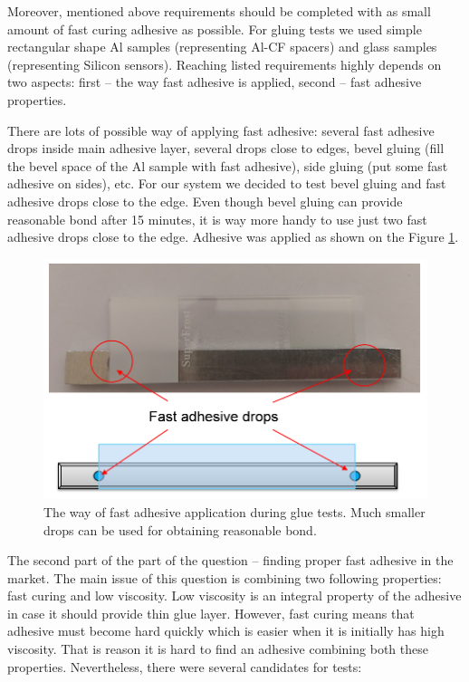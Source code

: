 Moreover, mentioned above requirements should be completed with as small amount of fast curing adhesive as possible. For gluing tests we used simple rectangular shape Al samples (representing Al-CF spacers) and glass samples (representing Silicon sensors). Reaching listed requirements highly depends on two aspects: first -- the way fast adhesive is applied, second -- fast adhesive properties.

There are lots of possible way of applying fast adhesive: several fast adhesive drops inside main adhesive layer, several drops close to edges, bevel gluing (fill the bevel space of the Al sample with fast adhesive), side gluing (put some fast adhesive on sides), etc. For our system we decided to test bevel gluing and fast adhesive drops close to the edge. Even though bevel gluing can provide reasonable bond after 15 minutes, it is way more handy to use just two fast adhesive drops close to the edge. Adhesive was applied as shown on the Figure \ref{fig:glue_application}. 

\begin{figure}[ht]\centering
\includegraphics[width=0.7\linewidth]{Data/Module_assembly/Fast_glue_application.png}
\caption{The way of fast adhesive application during glue tests. Much smaller drops can be used for obtaining reasonable bond.}
\label{fig:glue_application}
\end{figure}

The second part of the part of the question -- finding proper fast adhesive in the market. The main issue of this question is combining two following properties: fast curing and low viscosity. Low viscosity is an integral property of the adhesive in case it should provide thin glue layer. However, fast curing means that adhesive must become hard quickly which is easier when it is initially has high viscosity. That is reason it is hard to find an adhesive combining both these properties. Nevertheless, there were several candidates for tests:

